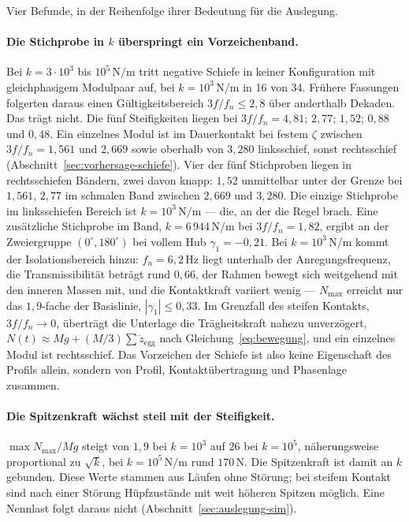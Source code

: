 \documentclass[12pt,a4paper]{report}
\begin{document}
Vier Befunde, in der Reihenfolge ihrer Bedeutung für die Auslegung.

\paragraph{Die Stichprobe in $k$ überspringt ein Vorzeichenband.}
Bei $k = 3\cdot10^{3}$ bis $10^{5}\,\mathrm{N/m}$ tritt negative Schiefe
in keiner Konfiguration mit gleichphasigem Modulpaar auf, bei
$k = 10^{3}\,\mathrm{N/m}$ in 16 von 34. Frühere Fassungen folgerten
daraus einen Gültigkeitsbereich $3f/f_n \leq 2{,}8$ über anderthalb
Dekaden. Das trägt nicht. Die fünf Steifigkeiten liegen bei
$3f/f_n = 4{,}81$; $2{,}77$; $1{,}52$; $0{,}88$ und $0{,}48$. Ein
einzelnes Modul ist im Dauerkontakt bei festem $\zeta$ zwischen
$3f/f_n = 1{,}561$ und $2{,}669$ sowie oberhalb von $3{,}280$
linksschief, sonst rechtsschief (Abschnitt~\ref{sec:vorhersage-schiefe}).
Vier der fünf Stichproben liegen in rechtsschiefen Bändern, zwei davon
knapp: $1{,}52$ unmittelbar unter der Grenze bei $1{,}561$, $2{,}77$ im
schmalen Band zwischen $2{,}669$ und $3{,}280$. Die einzige Stichprobe im
linksschiefen Bereich ist $k = 10^{3}\,\mathrm{N/m}$ --- die, an der die
Regel brach. Eine zusätzliche Stichprobe im Band,
$k = 6\,944\,\mathrm{N/m}$ bei $3f/f_n = 1{,}82$, ergibt an der
Zweiergruppe $(0^\circ, 180^\circ)$ bei vollem Hub $\gamma_1 = -0{,}21$.
Bei $k = 10^{3}\,\mathrm{N/m}$ kommt der Isolationsbereich hinzu:
$f_n = 6{,}2\,\mathrm{Hz}$ liegt unterhalb der Anregungsfrequenz, die
Transmissibilität beträgt rund $0{,}66$, der Rahmen bewegt sich
weitgehend mit den inneren Massen mit, und die Kontaktkraft variiert
wenig --- $N_{\max}$ erreicht nur das $1{,}9$-fache der Basislinie,
$|\gamma_1| \leq 0{,}33$. Im Grenzfall des steifen Kontakts,
$3f/f_n \to 0$, überträgt die Unterlage die Trägheitskraft nahezu
unverzögert, $N(t) \approx Mg + (M/3)\sum \ddot{z}_{\mathrm{egg}}$ nach
Gleichung~\eqref{eq:bewegung}, und ein einzelnes Modul ist rechtsschief.
Das Vorzeichen der Schiefe ist also keine Eigenschaft des Profils allein,
sondern von Profil, Kontaktübertragung und Phasenlage zusammen.

\paragraph{Die Spitzenkraft wächst steil mit der Steifigkeit.}
$\max N_{\max}/Mg$ steigt von $1{,}9$ bei $k = 10^{3}$ auf $26$ bei
$k = 10^{5}$, näherungsweise proportional zu $\sqrt{k}$, bei
$k = 10^{5}\,\mathrm{N/m}$ rund $170\,\mathrm{N}$. Die Spitzenkraft ist
damit an $k$ gebunden. Diese Werte stammen aus Läufen ohne Störung; bei
steifem Kontakt sind nach einer Störung Hüpfzustände mit weit höheren
Spitzen möglich. Eine Nennlast folgt daraus nicht
(Abschnitt~\ref{sec:auslegung-sim}).
\end{document}
